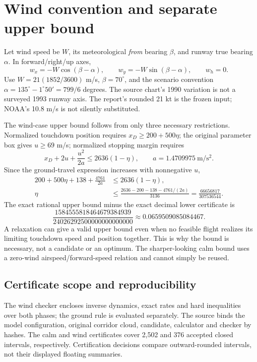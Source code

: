 \section{Wind convention and separate upper bound}\label{app:windbound}
Let wind speed be $W$, its meteorological \emph{from} bearing $\beta$, and runway true bearing $\alpha$. In forward/right/up axes,
\[
w_x=-W\cos(\beta-\alpha),\qquad w_y=-W\sin(\beta-\alpha),\qquad w_h=0.
\]
Use $W=21(1852/3600)$ m/s, $\beta=70^\circ$, and the scenario convention $\alpha=135^\circ-1^\circ50'=799/6$ degrees. The source chart's 1990 variation is not a surveyed 1993 runway axis. The report's rounded 21 kt is the frozen input; NOAA's 10.8 m/s is not silently substituted.

The wind-case upper bound follows from only three necessary restrictions. Normalized touchdown position requires $x_D\geq200+500\eta$; the original parameter box gives $u\geq69$ m/s; normalized stopping margin requires
\[
x_D+2u+\frac{u^2}{2a}\leq2636(1-\eta),\qquad a=1.4709975\ \mathrm{m/s^2}.
\]
Since the ground-travel expression increases with nonnegative $u$,
\begin{align}
200+500\eta+138+\frac{4761}{2a}&\leq2636(1-\eta),\\
\eta&\leq\frac{2636-200-138-4761/(2a)}{3136}
=\frac{66656817}{307536544}.
\end{align}
The exact rational upper bound minus the exact decimal lower certificate is
\[
\frac{1584555818464679384939}{24026292500000000000000}
\approx0.0659509085084467.
\]
A relaxation can give a valid upper bound even when no feasible flight realizes its limiting touchdown speed and position together. This is why the bound is necessary, not a candidate or an optimum. The sharper-looking calm bound uses a zero-wind airspeed/forward-speed relation and cannot simply be reused.

\subsection*{Certificate scope and reproducibility}
The wind checker encloses inverse dynamics, exact rates and hard inequalities over both phases; the ground rule is evaluated separately. The source binds the model configuration, original corridor cloud, candidate, calculator and checker by hashes. The calm and wind certificates cover 2,502 and 376 accepted closed intervals, respectively. Certification decisions compare outward-rounded intervals, not their displayed floating summaries.

